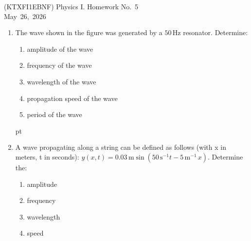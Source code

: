 \documentclass[a4paper,12pt]{letter}
\begin{document}
\begin{center}
 (KTXFI1EBNF) Physics I.  Homework No.~5\\ \smallskip
May~26,~2026
 \end{center}

\begin{enumerate}

\item The wave shown in the figure was generated by a $50\,\mathrm{Hz}$ resonator. Determine:
\begin{enumerate}
\item[a)] amplitude of the wave
\item[b)] frequency of the wave
\item[c)] wavelength of the wave
\item[d)] propagation speed of the wave
\item[e)] period of the wave
\end{enumerate}

\begin{center}
 pt
\end{center}
  

\item A wave propagating along a string can be defined as follows (with x in meters, t in seconds): $y(x,t)=0.03\,\mathrm{m}\sin(50\,\mathrm{s^{-1}}t-5\,\mathrm{m^{-1}}\,x).$ Determine the:
\begin{enumerate}
\item[a)] amplitude
\item[b)] frequency
\item[c)] wavelength
\item[d)] speed
\end{enumerate}


\end{enumerate}
\end{document}
